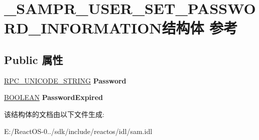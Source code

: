 \hypertarget{struct___s_a_m_p_r___u_s_e_r___s_e_t___p_a_s_s_w_o_r_d___i_n_f_o_r_m_a_t_i_o_n}{}\section{\+\_\+\+S\+A\+M\+P\+R\+\_\+\+U\+S\+E\+R\+\_\+\+S\+E\+T\+\_\+\+P\+A\+S\+S\+W\+O\+R\+D\+\_\+\+I\+N\+F\+O\+R\+M\+A\+T\+I\+O\+N结构体 参考}
\label{struct___s_a_m_p_r___u_s_e_r___s_e_t___p_a_s_s_w_o_r_d___i_n_f_o_r_m_a_t_i_o_n}
\subsection*{Public 属性}
\begin{DoxyCompactItemize}
\item 
\mbox{\label{struct___s_a_m_p_r___u_s_e_r___s_e_t___p_a_s_s_w_o_r_d___i_n_f_o_r_m_a_t_i_o_n_a77fb2a1eb48ae10651297650de896cbb}} 
\hyperlink{struct___r_p_c___u_n_i_c_o_d_e___s_t_r_i_n_g}{R\+P\+C\+\_\+\+U\+N\+I\+C\+O\+D\+E\+\_\+\+S\+T\+R\+I\+NG} {\bfseries Password}
\item 
\mbox{\label{struct___s_a_m_p_r___u_s_e_r___s_e_t___p_a_s_s_w_o_r_d___i_n_f_o_r_m_a_t_i_o_n_a373139a139b9f198946e5f66de971c28}} 
\hyperlink{_processor_bind_8h_a112e3146cb38b6ee95e64d85842e380a}{B\+O\+O\+L\+E\+AN} {\bfseries Password\+Expired}
\end{DoxyCompactItemize}


该结构体的文档由以下文件生成\+:\begin{DoxyCompactItemize}
\item 
E\+:/\+React\+O\+S-\/0../sdk/include/reactos/idl/sam.\+idl\end{DoxyCompactItemize}
